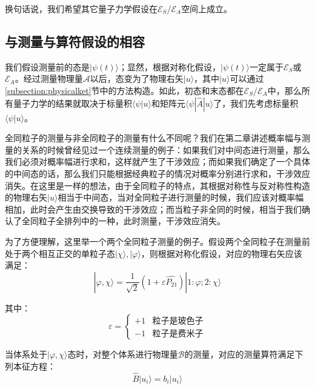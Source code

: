     换句话说，我们希望其它量子力学假设在$\mathscr{E}_S$/$\mathscr{E}_A$空间上成立。
    
        \subsection{与测量与算符假设的相容}
        我们假设测量前的态是$|\psi(t)\rangle$；显然，根据对称化假设，$|\psi(t)\rangle$一定属于$\mathscr{E}_S$或$\mathscr{E}_A$。经过测量物理量$\mathscr{A}$以后，态变为了物理右矢$|u\rangle$，其中$|u\rangle$可以通过\ref{subsection:physicalket}节中的方法构造。如此，初态和末态都在$\mathscr{E}_S$/$\mathscr{E}_A$中，那么所有量子力学的结果就取决于标量积$\langle \psi|u\rangle$和矩阵元$\langle\psi|\hat{A}|u\rangle$了，我们先考虑标量积$\langle \psi|u\rangle$。
        
                \begin{remark}
        全同粒子的测量与非全同粒子的测量有什么不同呢？我们在第二章讲述概率幅与测量的关系的时候曾经见过一个连续测量的例子：如果我们对中间态进行测量，那么我们必须对概率幅进行求和，这样就产生了干涉效应；而如果我们确定了一个具体的中间态的话，那么我们只能根据经典粒子的情况对概率分别进行求和，干涉效应消失。在这里是一样的想法，由于全同粒子的特点，其根据对称性与反对称性构造的物理右矢$|u\rangle$相当于中间态，当对全同粒子进行测量的时候，我们应该对概率幅相加，此时会产生由交换导致的干涉效应；而当粒子非全同的时候，相当于我们确认了全同粒子全排列中的一种，此时测量，干涉效应消失。
        
        为了方便理解，这里举一个两个全同粒子测量的例子。假设两个全同粒子在测量前处于两个相互正交的单粒子态$|\chi\rangle,|\varphi\rangle$，则根据对称化假设，对应的物理右矢应该满足：
        \begin{equation}
            |\varphi,\chi\rangle=\frac{1}{\sqrt{2}}(1+\varepsilon\hat{P_{21}})|1:\varphi;2:\chi\rangle
        \end{equation}
        
        其中：
        \begin{equation}
            \varepsilon=\left\{
            \begin{array}{cc}
                +1 & \text{粒子是玻色子} \\
                -1 & \text{粒子是费米子}
            \end{array}
            \right.
        \end{equation}
        
        当体系处于$|\varphi,\chi\rangle$态时，对整个体系进行物理量$\mathscr{B}$的测量，对应的测量算符满足下列本征方程：
        \begin{equation}
            \hat{B}|u_i\rangle=b_i|u_i\rangle
        \end{equation}
        

\end{remark}
